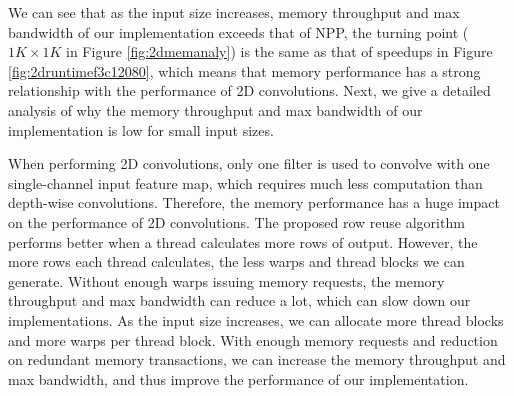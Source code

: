 We can see that as the input size increases, memory throughput and max bandwidth of our implementation exceeds that of NPP, the turning point ($1K \times 1K$ in Figure \ref{fig:2dmemanaly}) is the same as that of speedups in Figure \ref{fig:2druntimef3c12080}, which means that memory performance has a strong relationship with the performance of 2D convolutions. Next, we give a detailed analysis of why the memory throughput and max bandwidth of our implementation is low for small input sizes.

When performing 2D convolutions, only one filter is used to convolve with one single-channel input feature map, which requires much less computation than depth-wise convolutions. Therefore, the memory performance has a huge impact on the performance of 2D convolutions. The proposed row reuse algorithm performs better when a thread calculates more rows of output. However, the more rows each thread calculates, the less warps and thread blocks we can generate. Without enough warps issuing memory requests, the memory throughput and max bandwidth can reduce a lot, which can slow down our implementations. As the input size increases, we can allocate more thread blocks and more warps per thread block. With enough memory requests and reduction on redundant memory transactions, we can increase the memory throughput and max bandwidth, and thus improve the performance of our implementation.


